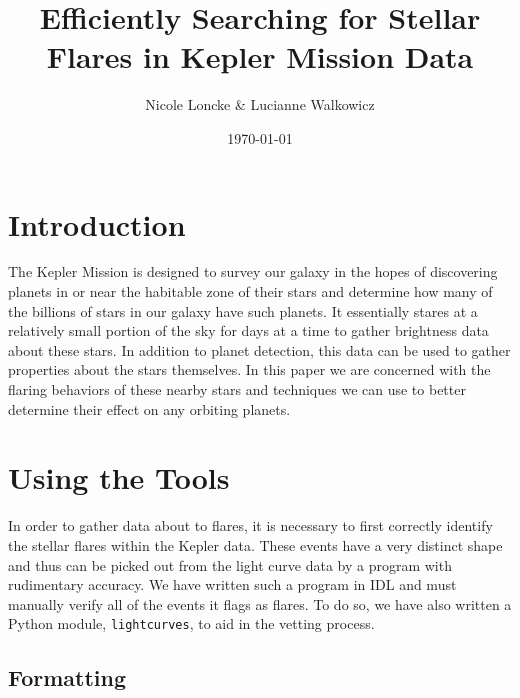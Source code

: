 \documentclass[11pt]{article}
\author{Nicole Loncke \& Lucianne Walkowicz}
\date{\today}
\title{Efficiently Searching for Stellar Flares in Kepler Mission Data}
\begin{document}
\maketitle{}

\section{Introduction}
\label{sec:intro}

The Kepler Mission is designed to survey our galaxy in the hopes of
discovering planets in or near the habitable zone of their stars and
determine how many of the billions of stars in our galaxy have such
planets. It essentially stares at a relatively small portion of the
sky for days at a time to gather brightness data about these stars.
In addition to planet detection, this data can be used to gather
properties about the stars themselves.  In this paper we are concerned
with the flaring behaviors of these nearby stars and techniques we can
use to better determine their effect on any orbiting planets.

\section{Using the Tools}
\label{sec:tools}
In order to gather data about to flares, it is necessary to first
correctly identify the stellar flares within the Kepler data.  These
events have a very distinct shape and thus can be picked out from the
light curve data by a program with rudimentary accuracy.  We have
written such a program in IDL and must manually verify all of the
events it flags as flares.  To do so, we have also written a Python
module, \verb|lightcurves|, to aid in the vetting process.


\subsection{Formatting}
\label{sec:format}
\end{document}
